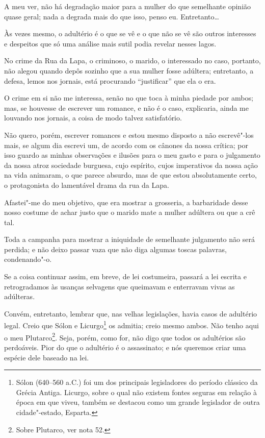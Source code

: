 A meu ver, não há degradação maior para a mulher do que semelhante
opinião quase geral; nada a degrada mais do que isso, penso eu.
Entretanto\ldots{}

Às vezes mesmo, o adultério é o que se vê e o que não se vê são outros
interesses e despeitos que só uma análise mais sutil podia revelar
nesses lagos.

No crime da Rua da Lapa, o criminoso, o marido, o interessado no caso,
portanto, não alegou quando depôs sozinho que a sua mulher fosse
adúltera; entretanto, a defesa, lemos nos jornais, está procurando
``justificar'' que ela o era.

O crime em si não me interessa, senão no que toca à minha piedade por
ambos; mas, se houvesse de escrever um romance, e não é o caso,
explicaria, ainda me louvando nos jornais, a coisa de modo talvez
satisfatório.

Não quero, porém, escrever romances e estou mesmo disposto a não
escrevê"-los mais, se algum dia escrevi um, de acordo com os cânones da
nossa crítica; por isso guardo as minhas observações e ilusões para o
meu gasto e para o julgamento da nossa atroz sociedade burguesa, cujo
espírito, cujos imperativos da nossa ação na vida animaram, o que parece
absurdo, mas de que estou absolutamente certo, o protagonista do
lamentável drama da rua da Lapa.

Afastei"-me do meu objetivo, que era mostrar a grosseria, a barbaridade
desse nosso costume de achar justo que o marido mate a mulher adúltera
ou que a crê tal.

Toda a campanha para mostrar a iniquidade de semelhante julgamento não
será perdida; e não deixo passar vaza que não diga algumas toscas
palavras, condenando"-o.

Se a coisa continuar assim, em breve, de lei costumeira, passará a lei
escrita e retrogradamos às usanças selvagens que queimavam e enterravam
vivas as adúlteras.

Convém, entretanto, lembrar que, nas velhas legislações, havia casos de
adultério legal. Creio que Sólon e Licurgo\footnote{Sólon (640--560 a.C.) foi um dos principais legisladores do período clássico da
  Grécia Antiga. Licurgo, sobre o qual não existem fontes seguras em
  relação à época em que viveu, também se destacou como um grande
  legislador de outra cidade"-estado, Esparta.} os admitia; creio mesmo
ambos. Não tenho aqui o meu Plutarco\footnote{Sobre Plutarco, ver nota
  52.}. Seja, porém, como for, não digo que todos os adultérios são
perdoáveis. Pior do que o adultério é o assassinato; e nós queremos
criar uma espécie dele baseado na lei.

